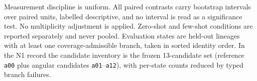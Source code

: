 Measurement discipline is uniform. All paired contrasts carry bootstrap intervals over paired units, labelled descriptive, and no interval is read as a significance test. No multiplicity adjustment is applied. Zero-shot and few-shot conditions are reported separately and never pooled. Evaluation states are held-out lineages with at least one coverage-admissible branch, taken in sorted identity order. In the N1 record the candidate inventory is the frozen 13-candidate set (reference \texttt{a00} plus angular candidates \texttt{a01}--\texttt{a12}), with per-state counts reduced by typed branch failures.

